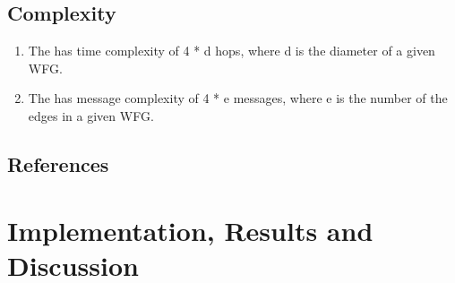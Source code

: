 \documentclass[letterpaper,10pt,english]{sphinxmanual}
\begin{document}
\subsection{Complexity}
\label{\detokenize{docs/BrachaToueg/algorithm:complexity}}\begin{enumerate}
%
\item {} 
\sphinxAtStartPar
{} The {\hyperref[\detokenize{docs/BrachaToueg/algorithm:brachatouegdeadlockdetectionalgorithm}]{}} has time complexity of 4 * d hops, where d is the diameter of a given WFG. 

\item {} 
\sphinxAtStartPar
{} The {\hyperref[\detokenize{docs/BrachaToueg/algorithm:brachatouegdeadlockdetectionalgorithm}]{}} has message complexity of 4 * e messages, where e is the number of the edges in a given WFG. 

\end{enumerate}


\subsection{References}
\label{\detokenize{docs/BrachaToueg/algorithm:references}}
\sphinxstepscope


\section{Implementation, Results and Discussion}
\label{\detokenize{docs/BrachaToueg/results:implementation-results-and-discussion}}\label{\detokenize{docs/BrachaToueg/results::doc}}
\end{document}
